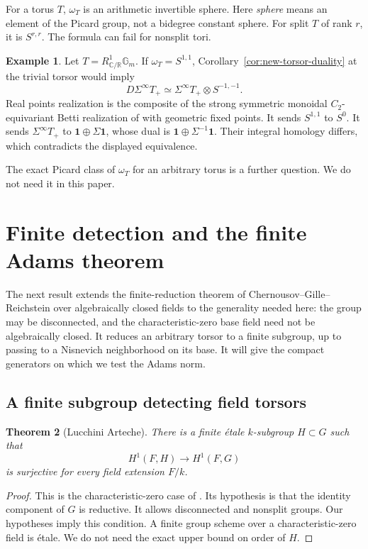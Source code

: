 \documentclass[11pt,reqno]{amsart}
\newtheorem{theorem}{Theorem}[section]
\theoremstyle{definition}
\newtheorem{example}[theorem]{Example}
\theoremstyle{remark}
\theoremstyle{plain}
\numberwithin{equation}{section}
\newcommand{\one}{\mathbf 1}
\newcommand{\Gm}{\mathbb G_m}
\begin{document}
For a torus \(T\), \(\omega_T\) is an arithmetic invertible sphere.
Here \emph{sphere} means an element of the Picard group, not a bidegree constant sphere.
For split \(T\) of rank \(r\), it is \(S^{r,r}\).
The formula can fail for nonsplit tori.

\begin{example}\label{ex:new-real-torus}
Let \(T=R^1_{\mathbb C/\mathbb R}\Gm\).
If \(\omega_T=S^{1,1}\), Corollary~\ref{cor:new-torsor-duality} at the trivial torsor would imply
\[
 D\Sigma^\infty T_+
 \simeq\Sigma^\infty T_+\otimes S^{-1,-1}.
\]
Real points realization is the composite of the strong symmetric monoidal
\(C_2\)-equivariant Betti realization of \cite[Proposition~4.8]{HellerOrmsbyGalois}
with geometric fixed points.
It sends \(S^{1,1}\) to \(S^0\).
It sends \(\Sigma^\infty T_+\) to
\(\one\oplus\Sigma\one\), whose dual is
\(\one\oplus\Sigma^{-1}\one\).
Their integral homology differs, which contradicts the displayed equivalence.
\end{example}

The exact Picard class of \(\omega_T\) for an arbitrary torus is a further question.
We do not need it in this paper. 

\section{Finite detection and the finite Adams theorem}\label{sec:reduction}

The next result extends the finite-reduction theorem of
Chernousov--Gille--Reichstein over algebraically closed fields
\cite[Corollary~1.4]{CGR08} to the generality needed here:
the group may be disconnected, and the characteristic-zero
base field need not be algebraically closed. 
It reduces an arbitrary torsor to a finite subgroup,
up to passing to a Nisnevich neighborhood on its base.
It will give the compact generators on which we test the Adams norm.

\subsection{A finite subgroup detecting field torsors}

\begin{theorem}[Lucchini Arteche]\label{thm:finite-subgroup}
There is a finite étale \(k\)-subgroup \(H\subset G\) such that
\[
 H^1(F,H)\longrightarrow H^1(F,G)
\]
is surjective for every field extension \(F/k\).
\end{theorem}
\begin{proof}
This is the characteristic-zero case of \cite[Corollary~18]{LA}.
Its hypothesis is that the identity component of \(G\) is reductive.
It allows disconnected and nonsplit groups.
Our hypotheses imply this condition.
A finite group scheme over a characteristic-zero field is étale.
We do not need the exact upper bound on order of \(H\).
\end{proof}
\end{document}
